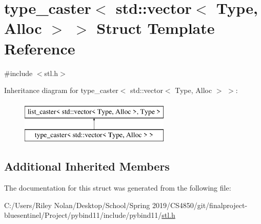 \hypertarget{structtype__caster_3_01std_1_1vector_3_01_type_00_01_alloc_01_4_01_4}{}\section{type\+\_\+caster$<$ std\+::vector$<$ Type, Alloc $>$ $>$ Struct Template Reference}
\label{structtype__caster_3_01std_1_1vector_3_01_type_00_01_alloc_01_4_01_4}


{\ttfamily \#include $<$stl.\+h$>$}

Inheritance diagram for type\+\_\+caster$<$ std\+::vector$<$ Type, Alloc $>$ $>$\+:\begin{figure}[H]
\begin{center}
\leavevmode
\includegraphics[height=2.000000cm]{structtype__caster_3_01std_1_1vector_3_01_type_00_01_alloc_01_4_01_4}
\end{center}
\end{figure}
\subsection*{Additional Inherited Members}


The documentation for this struct was generated from the following file\+:\begin{DoxyCompactItemize}
\item 
C\+:/\+Users/\+Riley Nolan/\+Desktop/\+School/\+Spring 2019/\+C\+S4850/git/finalproject-\/bluesentinel/\+Project/pybind11/include/pybind11/\mbox{\hyperlink{stl_8h}{stl.\+h}}\end{DoxyCompactItemize}
